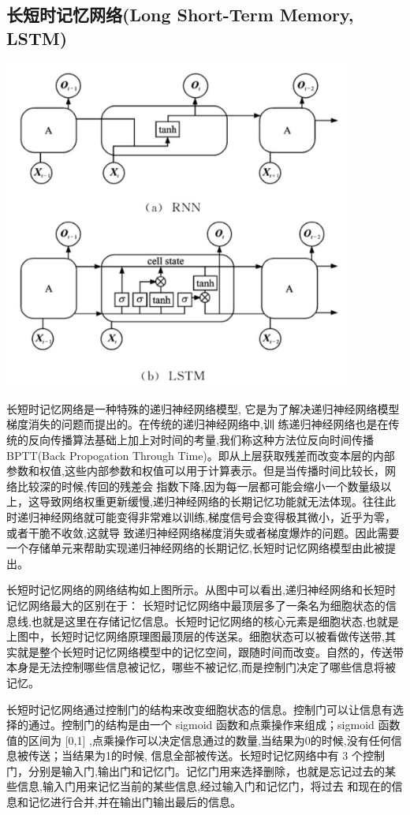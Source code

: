 \subsection{长短时记忆网络(Long Short-Term Memory, LSTM)}{
	\centerline{\includegraphics[width=4.5in]{figure/lstm.png}}
	长短时记忆网络是一种特殊的递归神经网络模型, 它是为了解决递归神经网络模型梯度消失的问题而提出的。在传统的递归神经网络中,训 练递归神经网络也是在传统的反向传播算法基础上加上对时间的考量,我们称这种方法位反向时间传播 BPTT(Back Propogation Through Time)。即从上层获取残差而改变本层的内部参数和权值,这些内部参数和权值可以用于计算表示。但是当传播时间比较长，网络比较深的时候,传回的残差会 指数下降,因为每一层都可能会缩小一个数量级以上，这导致网络权重更新缓慢,递归神经网络的长期记忆功能就无法体现。往往此时递归神经网络就可能变得非常难以训练,梯度信号会变得极其微小，近乎为零，或者干脆不收敛,这就导 致递归神经网络梯度消失或者梯度爆炸的问题。因此需要一个存储单元来帮助实现递归神经网络的长期记忆,长短时记忆网络模型由此被提出。
	
	长短时记忆网络的网络结构如上图所示。从图中可以看出,递归神经网络和长短时记忆网络最大的区别在于： 长短时记忆网络中最顶层多了一条名为细胞状态的信息线,也就是这里在存储记忆信息。长短时记忆网络的核心元素是细胞状态,也就是上图中，长短时记忆网络原理图最顶层的传送呆。细胞状态可以被看做传送带,其实就是整个长短时记忆网络模型中的记忆空间，跟随时间而改变。自然的，传送带本身是无法控制哪些信息被记忆，哪些不被记忆,而是控制门决定了哪些信息将被记忆。
	
	长短时记忆网络通过控制门的结构来改变细胞状态的信息。控制门可以让信息有选择的通过。控制门的结构是由一个 sigmoid 函数和点乘操作来组成；sigmoid 函数值的区间为 [0,1] ,点乘操作可以决定信息通过的数量,当结果为0的时候,没有任何信息被传送；当结果为1的时候, 信息全部被传送。长短时记忆网络中有 3 个控制门，分别是输入门,输出门和记忆门。记忆门用来选择删除，也就是忘记过去的某些信息,输入门用来记忆当前的某些信息,经过输入门和记忆门，将过去 和现在的信息和记忆进行合并,并在输出门输出最后的信息。
}


